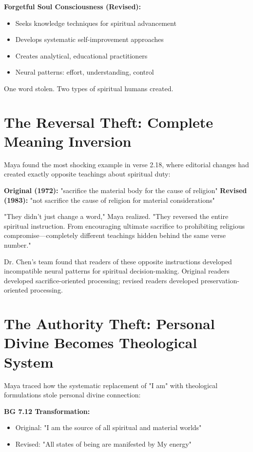\documentclass[11pt,twoside]{book}
\begin{document}
\textbf{\textbf{Forgetful Soul Consciousness (Revised):}}
\begin{itemize}
\item Seeks knowledge techniques for spiritual advancement
\item Develops systematic self-improvement approaches
\item Creates analytical, educational practitioners
\item Neural patterns: effort, understanding, control
\end{itemize}

One word stolen. Two types of spiritual humans created.
\section*{The Reversal Theft: Complete Meaning Inversion}
\label{sec:orgb042838}

Maya found the most shocking example in verse 2.18, where editorial changes had created exactly opposite teachings about spiritual duty:

\textbf{\textbf{Original (1972):}} "sacrifice the material body for the cause of religion"
\textbf{\textbf{Revised (1983):}} "not sacrifice the cause of religion for material considerations"

"They didn't just change a word," Maya realized. "They reversed the entire spiritual instruction. From encouraging ultimate sacrifice to prohibiting religious compromise—completely different teachings hidden behind the same verse number."

Dr. Chen's team found that readers of these opposite instructions developed incompatible neural patterns for spiritual decision-making. Original readers developed sacrifice-oriented processing; revised readers developed preservation-oriented processing.
\section*{The Authority Theft: Personal Divine Becomes Theological System}
\label{sec:org4c6d06a}

Maya traced how the systematic replacement of "I am" with theological formulations stole personal divine connection:

\textbf{\textbf{BG 7.12 Transformation:}}
\begin{itemize}
\item Original: "I am the source of all spiritual and material worlds"
\item Revised: "All states of being are manifested by My energy"
\end{itemize}
\end{document}
